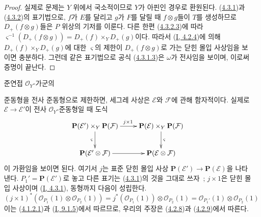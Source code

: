 \begin{proof}
실제로 문제는 $Y$ 위에서 국소적이므로 $Y$가 아핀인 경우로 환원된다.
(\hyperref[II.4.3.1-ko]{4.3.1})과
(\hyperref[II.4.3.2-ko]{4.3.2})의 표기법으로, $f$가 $E$를 달리고
$g$가 $F$를 달릴 때 $f\otimes g$들이 $T$를 생성하므로
$D_+(f\otimes g)$들은 $P$ 위상의 기저를 이룬다. 다른 한편
(\hyperref[II.4.3.2.3-ko]{4.3.2.3})에 따라
$\varsigma^{-1}(D_+(f\otimes g))=D_+(f)\times_YD_+(g)$이다. 따라서
(\hyperref[I.4.2.4-ko]{I, 4.2.4})에 의해
$D_+(f)\times_YD_+(g)$에 대한 $\varsigma$의 제한이
$D_+(f\otimes g)$로 가는 닫힌 몰입 사상임을 보이면 충분하다. 그런데
같은 표기법으로 공식 (\hyperref[II.4.3.1.3-ko]{4.3.1.3})은
$\omega$가 전사임을 보이며, 이로써 증명이 끝난다.
\end{proof}

\begin{env}[4.3.4]
\label{II.4.3.4-ko}
준연접 $\mathcal{O}_Y$-가군의


준동형을 전사 준동형으로 제한하면, 세그레 사상은 $\mathcal{E}$와
$\mathcal{F}$에 관해 함자적이다. 실제로
$\mathcal{E}\to\mathcal{E}'$이 전사 $\mathcal{O}_Y$-준동형일 때 도식
\[
  \xymatrix{
    \mathbf{P}(\mathcal{E}')\times_Y\mathbf{P}(\mathcal{F})
      \ar[r]^{j\times1} \ar[d]_{\varsigma}
    & \mathbf{P}(\mathcal{E})\times_Y\mathbf{P}(\mathcal{F})
      \ar[d]^{\varsigma}
    \\\mathbf{P}(\mathcal{E}'\otimes\mathcal{F}) \ar[r]
    & \mathbf{P}(\mathcal{E}\otimes\mathcal{F})
  }
\]
이 가환임을 보이면 된다. 여기서 $j$는 표준 닫힌 몰입 사상
$\mathbf{P}(\mathcal{E}')\to\mathbf{P}(\mathcal{E})$을 나타낸다.
$P_1'=\mathbf{P}(\mathcal{E}')$로 놓고 다른 표기는
(\hyperref[II.4.3.1-ko]{4.3.1})의 것을 그대로 쓰자~; $j\times1$은 닫힌
몰입 사상이며 (\hyperref[I.4.3.1-ko]{I, 4.3.1}), 동형까지 다음이
성립한다.
\[
  (j\times1)^*(\mathcal{O}_{P_1}(1)\otimes\mathcal{O}_{P_2}(1))
  =j^*(\mathcal{O}_{P_1}(1))\otimes\mathcal{O}_{P_2}(1)
  =\mathcal{O}_{P_1'}(1)\otimes\mathcal{O}_{P_2}(1)
\]
이는 (\hyperref[II.4.1.2.1-ko]{4.1.2.1})과
(\hyperref[I.9.1.5-ko]{I, 9.1.5})에서 따르므로, 우리의 주장은
(\hyperref[II.4.2.8-ko]{4.2.8})과
(\hyperref[II.4.2.9-ko]{4.2.9})에서 따른다.
\end{env}

